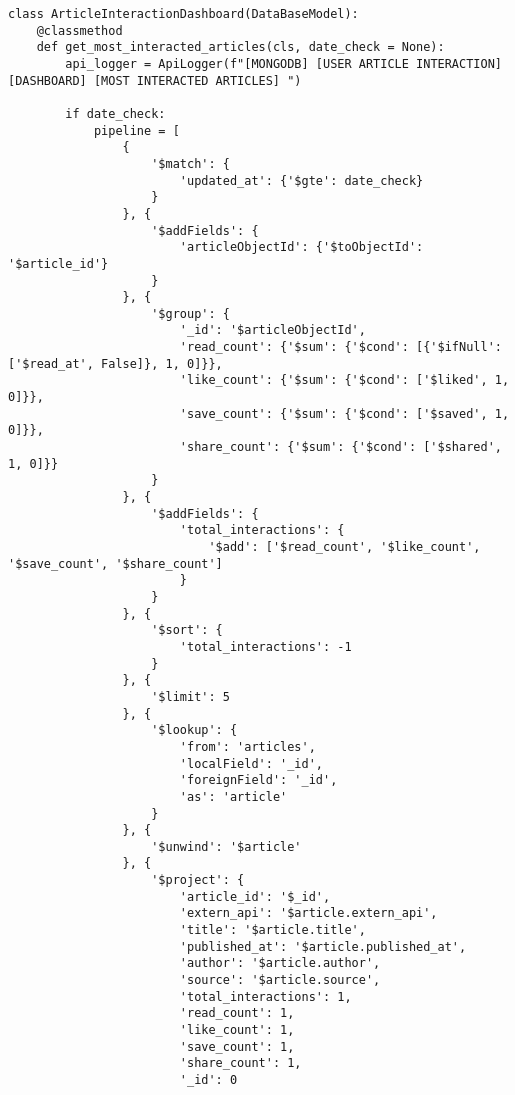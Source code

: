 \begin{lstlisting}[style=pythonstyle,label={lst:pipeline-most-interacted-articles},caption={Pipeline Most Interacted Articles}]
class ArticleInteractionDashboard(DataBaseModel):
    @classmethod
    def get_most_interacted_articles(cls, date_check = None):
        api_logger = ApiLogger(f"[MONGODB] [USER ARTICLE INTERACTION] [DASHBOARD] [MOST INTERACTED ARTICLES] ")

        if date_check:
            pipeline = [
                {
                    '$match': {
                        'updated_at': {'$gte': date_check}
                    }
                }, {
                    '$addFields': {
                        'articleObjectId': {'$toObjectId': '$article_id'}
                    }
                }, {
                    '$group': {
                        '_id': '$articleObjectId',
                        'read_count': {'$sum': {'$cond': [{'$ifNull': ['$read_at', False]}, 1, 0]}},
                        'like_count': {'$sum': {'$cond': ['$liked', 1, 0]}},
                        'save_count': {'$sum': {'$cond': ['$saved', 1, 0]}},
                        'share_count': {'$sum': {'$cond': ['$shared', 1, 0]}}
                    }
                }, {
                    '$addFields': {
                        'total_interactions': {
                            '$add': ['$read_count', '$like_count', '$save_count', '$share_count']
                        }
                    }
                }, {
                    '$sort': {
                        'total_interactions': -1
                    }
                }, {
                    '$limit': 5
                }, {
                    '$lookup': {
                        'from': 'articles',
                        'localField': '_id',
                        'foreignField': '_id',
                        'as': 'article'
                    }
                }, {
                    '$unwind': '$article'
                }, {
                    '$project': {
                        'article_id': '$_id',
                        'extern_api': '$article.extern_api',
                        'title': '$article.title',
                        'published_at': '$article.published_at',
                        'author': '$article.author',
                        'source': '$article.source',
                        'total_interactions': 1,
                        'read_count': 1,
                        'like_count': 1,
                        'save_count': 1,
                        'share_count': 1,
                        '_id': 0

\end{lstlisting}
